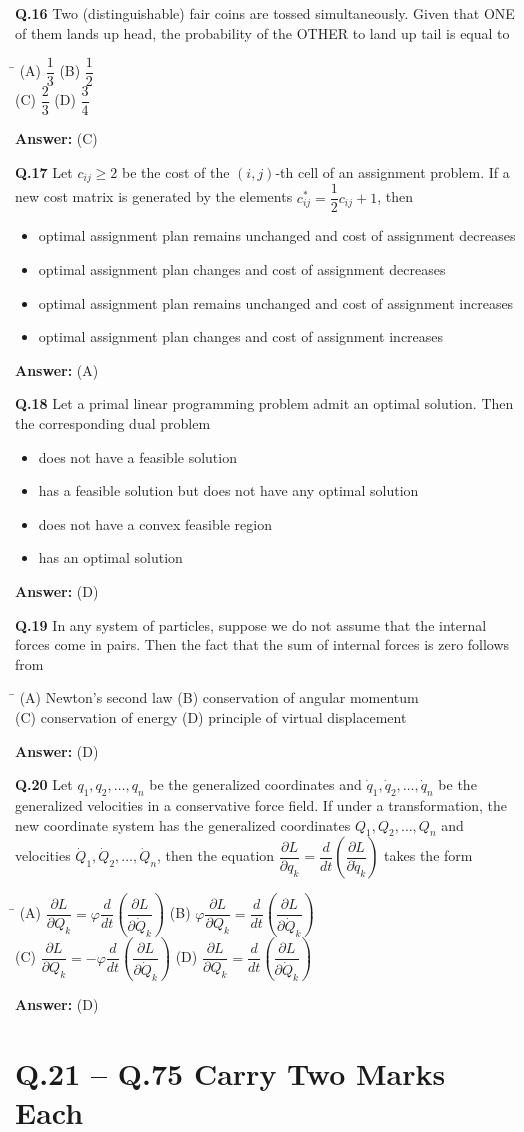 \documentclass[11pt,a4paper]{article}
\newcommand{\optsfourA}[4]{%
  \begin{tabbing}
    \hspace{0.48\linewidth}\=\kill
    (A) #1 \> (B) #2 \\[2pt]
    (C) #3 \> (D) #4
  \end{tabbing}%
}
\newcommand{\optslistA}[4]{%
  \begin{itemize}
    \setlength{\itemsep}{2pt}\setlength{\parskip}{0pt}
    \item[(A)] #1
    \item[(B)] #2
    \item[(C)] #3
    \item[(D)] #4
  \end{itemize}%
}
\newcommand{\ans}[1]{\textbf{Answer:} #1\par\medskip}
\begin{document}
\textbf{Q.16} Two (distinguishable) fair coins are tossed simultaneously. Given that ONE of them lands up head, the probability of the OTHER to land up tail is equal to
\optsfourA{$\dfrac{1}{3}$}{$\dfrac{1}{2}$}{$\dfrac{2}{3}$}{$\dfrac{3}{4}$}
\ans{(C)}

\textbf{Q.17} Let $c_{ij} \ge 2$ be the cost of the $(i, j)$-th cell of an assignment problem. If a new cost matrix is generated by the elements $c_{ij}^* = \dfrac{1}{2}c_{ij} + 1$, then
\optslistA{optimal assignment plan remains unchanged and cost of assignment decreases}{optimal assignment plan changes and cost of assignment decreases}{optimal assignment plan remains unchanged and cost of assignment increases}{optimal assignment plan changes and cost of assignment increases}
\ans{(A)}

\textbf{Q.18} Let a primal linear programming problem admit an optimal solution. Then the corresponding dual problem
\optslistA{does not have a feasible solution}{has a feasible solution but does not have any optimal solution}{does not have a convex feasible region}{has an optimal solution}
\ans{(D)}

\textbf{Q.19} In any system of particles, suppose we do not assume that the internal forces come in pairs. Then the fact that the sum of internal forces is zero follows from
\optsfourA{Newton's second law}{conservation of angular momentum}{conservation of energy}{principle of virtual displacement}
\ans{(D)}

\textbf{Q.20} Let $q_1, q_2, \dots, q_n$ be the generalized coordinates and $\dot{q}_1, \dot{q}_2, \dots, \dot{q}_n$ be the generalized velocities in a conservative force field. If under a transformation, the new coordinate system has the generalized coordinates $Q_1, Q_2, \dots, Q_n$ and velocities $\dot{Q}_1, \dot{Q}_2, \dots, \dot{Q}_n$, then the equation $\dfrac{\partial L}{\partial q_k} = \dfrac{d}{dt}\!\left(\dfrac{\partial L}{\partial \dot{q}_k}\right)$ takes the form
\optsfourA{$\dfrac{\partial L}{\partial Q_k} = \varphi\dfrac{d}{dt}\!\left(\dfrac{\partial L}{\partial \dot{Q}_k}\right)$}{$\varphi\dfrac{\partial L}{\partial Q_k} = \dfrac{d}{dt}\!\left(\dfrac{\partial L}{\partial \dot{Q}_k}\right)$}{$\dfrac{\partial L}{\partial Q_k} = -\varphi\dfrac{d}{dt}\!\left(\dfrac{\partial L}{\partial \dot{Q}_k}\right)$}{$\dfrac{\partial L}{\partial Q_k} = \dfrac{d}{dt}\!\left(\dfrac{\partial L}{\partial \dot{Q}_k}\right)$}
\ans{(D)}

\section*{Q.21 -- Q.75 Carry Two Marks Each}
\end{document}
